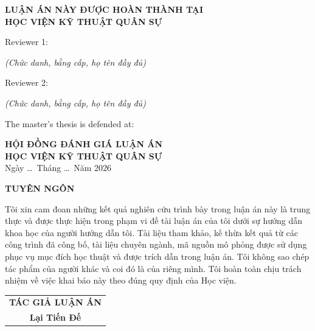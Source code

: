 \documentclass[a4paper,14pt]{extreport}
\newcommand{\academyName}{HỌC VIỆN KỸ THUẬT QUÂN SỰ}
\begin{document}
\newpage
\thispagestyle{empty}
\begin{center}
  \vspace*{0.1cm}
  \textbf{LUẬN ÁN NÀY ĐƯỢC HOÀN THÀNH TẠI}\\[0.25cm]
  \textbf{\academyName}\\[1.2cm]
\end{center}

\noindent Reviewer 1: \dotfill\\[-0.1cm]
\begin{center}
  \textit{(Chức danh, bằng cấp, họ tên đầy đủ)}
\end{center}

\vspace{0.3cm}
\noindent Reviewer 2: \dotfill\\[-0.1cm]
\begin{center}
  \textit{(Chức danh, bằng cấp, họ tên đầy đủ)}
\end{center}

\vspace{1.0cm}
\noindent The master's thesis is defended at:

\vspace{0.6cm}
\begin{center}
  \textbf{HỘI ĐỒNG ĐÁNH GIÁ LUẬN ÁN}\\
  \textbf{\academyName}\\[0.25cm]
  Ngày \ldots\ Tháng \ldots\ Năm 2026
\end{center}

\newpage
{}
\setcounter{page}{1}

\begin{center}
  \textbf{TUYÊN NGÔN}
\end{center}

Tôi xin cam đoan những kết quả nghiên cứu trình bày trong luận án này là trung thực và được thực hiện trong phạm vi đề tài luận án của tôi dưới sự hướng dẫn khoa học của người hướng dẫn tôi. Tài liệu tham khảo, kế thừa kết quả từ các công trình đã công bố, tài liệu chuyên ngành, mã nguồn mô phỏng được sử dụng phục vụ mục đích học thuật và được trích dẫn trong luận án. Tôi không sao chép tác phẩm của người khác và coi đó là của riêng mình. Tôi hoàn toàn chịu trách nhiệm về việc khai báo này theo đúng quy định của Học viện.

\vspace{2.0cm}
\begin{flushright}
  \begin{tabular}{c}
    \textbf{TÁC GIẢ LUẬN ÁN}\\[2.0cm]
    \textbf{Lại Tiến Đế}
  \end{tabular}
\end{flushright}
\end{document}
